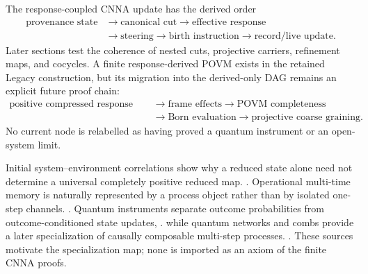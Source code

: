 The response-coupled CNNA update has the derived order
\[
\begin{aligned}
  \text{provenance state}&\longrightarrow\text{canonical cut}
  \longrightarrow\text{effective response}\\
  &\longrightarrow\text{steering}
  \longrightarrow\text{birth instruction}
  \longrightarrow\text{record/live update}.
\end{aligned}
\]
Later sections test the coherence of nested cuts, projective carriers, refinement maps, and cocycles.  A finite response-derived POVM exists in the retained Legacy construction, but its migration into the derived-only DAG remains an explicit future proof chain: \[
\begin{aligned}
  \text{positive compressed response state}
  &\longrightarrow \text{frame effects}
  \longrightarrow \text{POVM completeness}\\
  &\longrightarrow \text{Born evaluation}
  \longrightarrow \text{projective coarse graining}.
\end{aligned}
\]  No current node is relabelled as having proved a quantum instrument or an open-system limit.

Initial system--environment correlations show why a reduced state alone need not determine a universal completely positive reduced map.
\cite[principal result]{Pechukas1994ReducedDynamics}.
Operational multi-time memory is naturally represented by a process object rather than by isolated one-step channels.
\cite[Abstract and process-tensor construction]{Pollock2018NonMarkovianProcesses}.
Quantum instruments separate outcome probabilities from outcome-conditioned state updates,
\cite[operational instrument framework]{DaviesLewis1970OperationalQuantumProbability}.
while quantum networks and combs provide a later specialization of causally composable multi-step processes.
\cite[quantum-network and comb framework]{Chiribella2009QuantumNetworks}.
These sources motivate the specialization map; none is imported as an axiom of the finite CNNA proofs.
